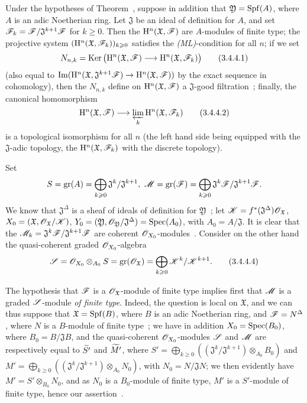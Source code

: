 \begin{corollary}[3.4.4]
\label{3.3.4.4}
Under the hypotheses of Theorem~, suppose in addition that $\mathfrak{Y}=\operatorname{Spf}(A)$, where $A$ is an adic Noetherian ring.
Let $\mathfrak{J}$ be an ideal of definition for $A$, and set $\mathscr{F}_k=\mathscr{F}/\mathfrak{J}^{k+1}\mathscr{F}$ for $k\geq 0$.
Then the $\mathrm{H}^n(\mathfrak{X},\mathscr{F})$ are $A$-modules of finite type; the projective system $(\mathrm{H}^n(\mathfrak{X},\mathscr{F}_k))_{k\geqslant 0}$ satisfies the \emph{(ML)}-condition for all $n$; if we set
\[
\label{3.3.4.4.1}
  N_{n,k}=\Ker\big(\HH^n(\mathfrak{X},\sh{F})\to\HH^n(\mathfrak{X},\sh{F}_k)\big)
  \tag{3.4.4.1}
\]
(also equal to $\Im(\HH^n(\mathfrak{X},\mathfrak{J}^{k+1}\sh{F})\to\HH^n(\mathfrak{X},\sh{F}))$ by the exact sequence in cohomology), then the $N_{n,k}$ define on $\mathrm{H}^n(\mathfrak{X},\mathscr{F})$ a $\mathfrak{J}$-good filtration~; finally, the canonical homomorphism
\[
\label{3.3.4.4.2}
  \HH^n(\mathfrak{X},\sh{F})\to\varprojlim_k\HH^n(\mathfrak{X},\sh{F}_k)
  \tag{3.4.4.2}
\]
is a topological isomorphism for all $n$ (the left hand side being equipped with the $\mathfrak{J}$-adic topology, the $\mathrm{H}^n(\mathfrak{X},\mathscr{F}_k)$ with the discrete topology).
\end{corollary}

Set
\[
\label{3.3.4.4.3}
  S=\gr(A)=\bigoplus_{k\geq 0}\mathfrak{J}^k/\mathfrak{J}^{k+1},\ \sh{M}=\gr(\sh{F})=\bigoplus_{k\geq 0}\mathfrak{J}^k\sh{F}/\mathfrak{J}^{k+1}\sh{F}.
\]
We know that $\mathfrak{J}^\Delta$ is a sheaf of ideals of definition for $\mathfrak{Y}$~; let $\mathscr{K}=f^*(\mathfrak{J}^\Delta)\mathscr{O}_\mathfrak{X}$, $X_0=(\mathfrak{X},\mathscr{O}_\mathfrak{X}/\mathscr{K})$, $Y_0=(\mathfrak{Y},\mathscr{O}_\mathfrak{Y}/\mathfrak{J}^\Delta)=\operatorname{Spec}(A_0)$, with $A_0=A/\mathfrak{J}$.
It is clear that the $\mathscr{M}_k=\mathfrak{J}^k\mathscr{F}/\mathfrak{J}^{k+1}\mathscr{F}$ are coherent $\mathscr{O}_{X_0}$-modules~.
Consider on the other hand the quasi-coherent graded $\mathscr{O}_{X_0}$-algebra
\[
\label{3.3.4.4.4}
  \mathscr{S}=\mathscr{O}_{X_0}\otimes_{A_0}S=\operatorname{gr}(\mathscr{O}_\mathfrak{X})=\bigoplus_{k\geqslant 0}\mathscr{K}^k/\mathscr{K}^{k+1}.
  \tag{3.4.4.4}
\]

The hypothesis that $\mathscr{F}$ is a $\mathscr{O}_\mathfrak{X}$-module of finite type implies first that $\mathscr{M}$ is
a graded $\mathscr{S}$-module \emph{of finite type}.
Indeed, the question is local on $\mathfrak{X}$, and we can thus suppose that $\mathfrak{X}=\operatorname{Spf}(B)$, where $B$ is an adic Noetherian ring, and $\mathscr{F}=N^\Delta$, where $N$ is a $B$-module of finite type~; we have in addition $X_0=\operatorname{Spec}(B_0)$, where $B_0=B/\mathfrak{J}B$, and the quasi-coherent $\mathscr{O}_{X_0}$-modules $\mathscr{S}$ and $\mathscr{M}$ are respectively equal to ${\widetilde{S'}}$ and ${\widetilde{M'}}$, where $S'=\bigoplus_{k\geq 0}((\mathfrak{J}^k/\mathfrak{J}^{k+1})\otimes_{A_0}B_0)$ and $M'=\bigoplus_{k\geq 0}((\mathfrak{J}^k/\mathfrak{J}^{k+1})\otimes_{A_0}N_0)$, with $N_0=N/\mathfrak{J}N$; we then evidently have $M'=S'\otimes_{B_0}N_0$, and as $N_0$ is a $B_0$-module of finite type, $M'$ is a $S'$-module of finite type, hence our assertion~.

